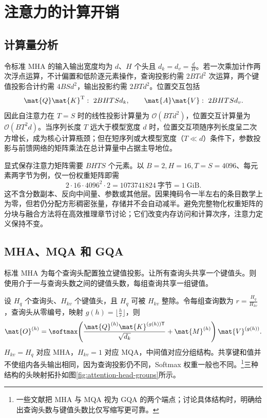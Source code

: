 \documentclass[../textbook.tex]{subfiles}
\begin{document}
\section{注意力的计算开销}

\subsection{计算量分析}
令标准 MHA 的输入输出宽度均为 $d$、$H$ 个头且 $d_k=d_v=\frac{d}{H}$。若一次乘加计作两次浮点运算，不计偏置和低阶逐元素操作，查询投影约需 $2BTd^2$ 次运算，两个键值投影合计约需 $4BSd^2$，输出投影约需 $2BTd^2$。位置交互包括
\begin{equation}
 \mat{Q}\mat{K}^{\mathrm{T}}:\ 2BHTSd_k,\qquad \mat{A}\mat{V}:\ 2BHTSd_v.
\end{equation}
因此自注意力在 $T=S$ 时的线性投影计算量为 $\mathcal{O}(BTd^2)$，位置交互计算量为 $\mathcal{O}(BT^2d)$。当序列长度 $T$ 远大于模型宽度 $d$ 时，位置交互项随序列长度呈二次方增长，成为核心计算瓶颈；但在短序列或大模型宽度（$T \ll d$）条件下，参数投影与前馈网络的矩阵乘法在总计算量中占据主导地位。

显式保存注意力矩阵需要 $BHTS$ 个元素。以 $B=2,H=16,T=S=4096$、每元素两字节为例，仅一份权重矩阵即需
\begin{equation}
 2\cdot16\cdot4096^2\cdot2=\num{1073741824}\ \text{字节}=1\ \text{GiB}.
\end{equation}
这不含分数副本、反向中间量、参数或其他层。因果掩码令一半左右的条目数学上为零，但若仍分配方形稠密张量，存储并不会自动减半。避免完整物化权重矩阵的分块与融合方法将在高效推理章节讨论；它们改变内存访问和计算次序，注意力定义保持不变。

\subsection{MHA、MQA 和 GQA}
标准 MHA 为每个查询头配置独立键值投影。让所有查询头共享一个键值头\cite{shazeer2019multiquery}。则使用介于一与查询头数之间的键值头数，每组查询共享一组键值\cite{ainslie2023gqa}。

设 $H_q$ 个查询头、$H_{kv}$ 个键值头，且 $H_q$ 可被 $H_{kv}$ 整除。令每组查询数为 $r=\frac{H_q}{H_{kv}}$，查询头从零编号，映射 $g(h)=\lfloor \frac{h}{r}\rfloor$，则
\begin{equation}
 \mat{O}^{(h)}=\softmax\!\left(\frac{\mat{Q}^{(h)}\mat{K}^{(g(h))\mathsf T}}{\sqrt{d_k}}+\mat{M}^{(h)}\right)\mat{V}^{(g(h))}.
\end{equation}
$H_{kv}=H_q$ 对应 MHA，$H_{kv}=1$ 对应 MQA，中间值对应分组结构。共享键和值并不使组内各头输出相同，因为查询投影仍不同，Softmax 权重一般也不同。\footnote{一些文献把 MHA 与 MQA 视为 GQA 的两个端点；讨论具体结构时，明确给出查询头数与键值头数比仅写缩写更可靠。}三种结构的头映射拓扑如图\ref{fig:attention-head-groups}所示。
\end{document}
